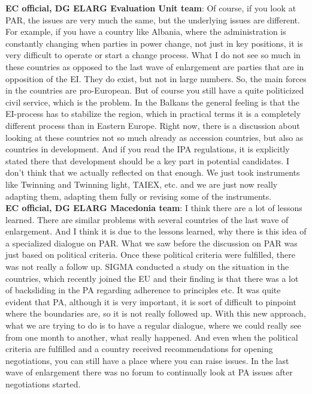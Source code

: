 \textbf{EC official, DG ELARG Evaluation Unit team}: Of course, if you look at PAR, the issues are very much the same, but the underlying issues are different. For example, if you have a country like Albania, where the administration is constantly changing when parties in power change, not just in key positions, it is very difficult to operate or start a change process. What I do not see so much in these countries as opposed to the last wave of enlargement are parties that are in opposition of the EI. They do exist, but not in large numbers. So, the main forces in the countries are pro-European. But of course you still have a quite politicized civil service, which is the problem. In the Balkans the general feeling is that the EI-process has to stabilize the region, which in practical terms it is a completely different process than in Eastern Europe. Right now, there is a discussion about looking at these countries not so much already as accession countries, but also as countries in development. And if you read the IPA regulations, it is explicitly stated there that development should be a key part in potential candidates. I don't think that we actually reflected on that enough. We just took instruments like Twinning and Twinning light, TAIEX, etc. and we are just now really adapting them, adapting them fully or revising some of the instruments.\\
\textbf{EC official, DG ELARG Macedonia team}: I think there are a lot of lessons learned. There are similar problems with several countries of the last wave of enlargement. And I think it is due to the lessons learned, why there is this idea of a specialized dialogue on PAR. What we saw before the discussion on PAR was just based on political criteria. Once these political criteria were fulfilled, there was not really a follow up. SIGMA conducted a study on the situation in the countries, which recently joined the EU and their finding is that there was a lot of backsliding in the PA regarding adherence to principles etc. It was quite evident that PA, although it is very important, it is sort of difficult to pinpoint where the boundaries are, so it is not really followed up. With this new approach, what we are trying to do is to have a regular dialogue, where we could really see from one month to another, what really happened. And even when the political criteria are fulfilled and a country received recommendations for opening negotiations, you can still have a place where you can raise issues. In the last wave of enlargement there was no forum to continually look at PA issues after negotiations started. \\
